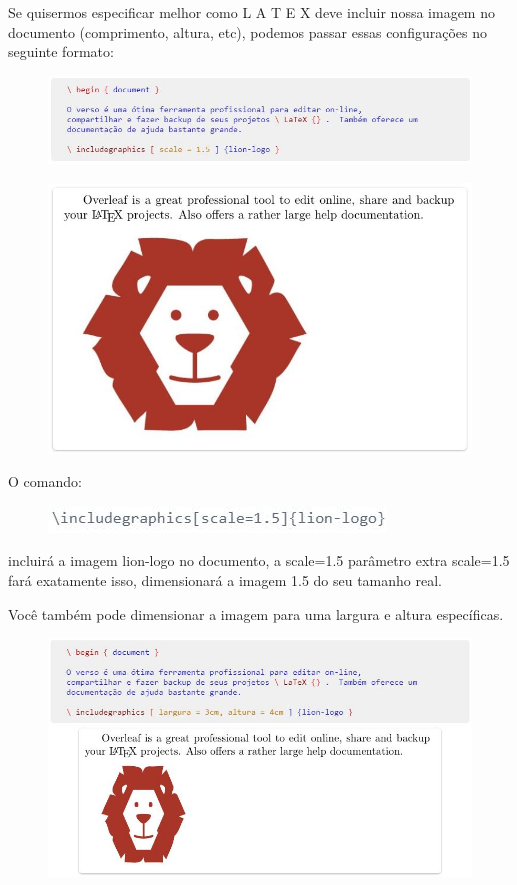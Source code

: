 \documentclass[12pt]{article}
\begin{document}
			\pagebreak
			Se quisermos especificar melhor como L A T E X deve incluir nossa imagem no documento (comprimento, altura, etc), podemos passar essas configurações no seguinte formato:
			\begin{figure} [h]
				\centering
				\includegraphics[scale=0.9]{22.JPG}
			\end{figure}
			\begin{figure} [h]
				\centering
				\includegraphics[scale=0.8]{23.JPG}
			\end{figure}
			\pagebreak
			
			O comando:
			\begin{figure} [h]
				\centering
				\includegraphics[scale=0.9]{24.JPG}
			\end{figure}
			
			
			incluirá a imagem lion-logo no documento, a scale=1.5 parâmetro extra scale=1.5 fará exatamente isso, dimensionará a imagem 1.5 do seu tamanho real.
			
			Você também pode dimensionar a imagem para uma largura e altura específicas.
			\begin{figure} [h]
				\centering
				\includegraphics[scale=0.9]{25.JPG}
			\end{figure}
			
\end{document}
